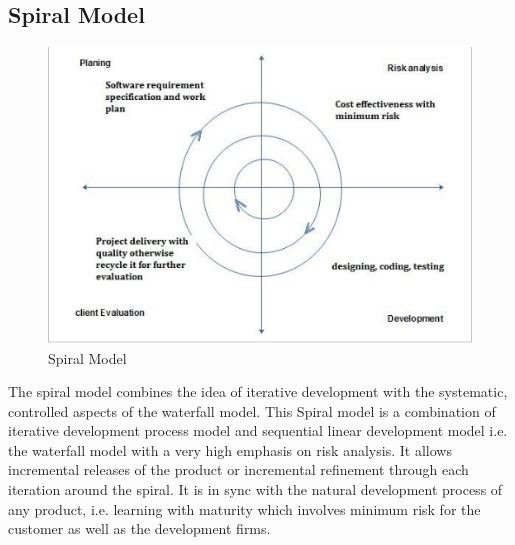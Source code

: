 \subsection{Spiral Model} 
\begin{figure}[ht]
\centering
\includegraphics[scale=0.38]{input/images/sm.png}
\caption{Spiral Model}
\label{fig:Anatomy}
\end{figure}
The spiral model combines the idea of iterative development with the systematic, controlled aspects of the waterfall model. This Spiral model is a combination of iterative development process model and sequential linear development model i.e. the waterfall model with a very high emphasis on risk analysis. It allows incremental releases of the product or incremental refinement through each iteration around the spiral. It is in sync with the natural development process of any product, i.e. learning with maturity which involves minimum risk for the customer as well as the development firms.